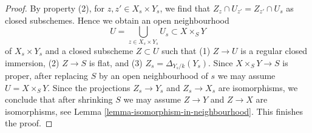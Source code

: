 \begin{proof}
\medskip\noindent
By property (2), for $z, z' \in X_s \times Y_s$, we
find that $Z_z \cap U_{z'} = Z_{z'} \cap U_s$ as closed subschemes.
Hence we obtain an open neighbourhood
$$
U = \bigcup_{z \in X_s \times Y_s} U_s \subset X \times_S Y
$$
of $X_s \times Y_s$ and a closed subscheme $Z \subset U$
such that (1) $Z \to U$ is a regular closed immersion,
(2) $Z \to S$ is flat, and (3) $Z_s = \Delta_{Y_s/k}(Y_s)$.
Since $X \times_S Y \to S$ is proper, after replacing $S$
by an open neighbourhood of $s$ we may assume $U = X \times_S Y$.
Since the projections $Z_s \to Y_s$ and $Z_s \to X_s$
are isomorphisms, we conclude that after shrinking $S$
we may assume $Z \to Y$ and $Z \to X$ are isomorphisms, see
Lemma \ref{lemma-isomorphism-in-neighbourhood}.
This finishes the proof.
\end{proof}


















